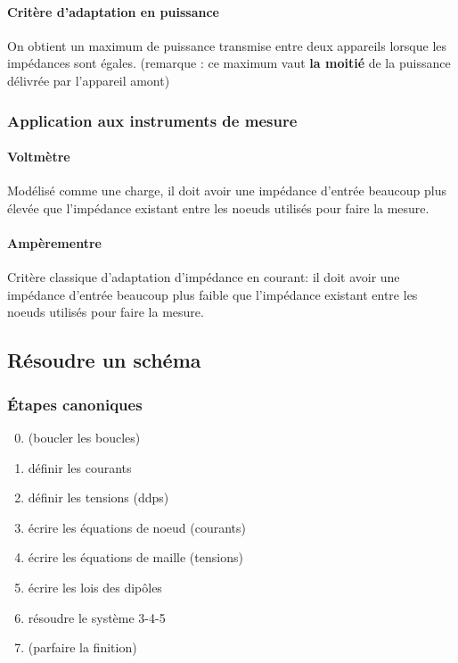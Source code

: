 \documentclass[a4paper]{article}
\begin{document}
    \paragraph{Critère d'adaptation en puissance} On obtient un maximum de puissance
    transmise entre deux appareils lorsque les impédances sont égales. (remarque :
    ce maximum vaut \textbf{la moitié} de la puissance délivrée par l'appareil amont)

    \subsubsection{Application aux instruments de mesure}
    \paragraph{Voltmètre} Modélisé comme une charge, il doit avoir une
    impédance d'entrée beaucoup plus élevée que l'impédance existant entre les 
    noeuds utilisés pour faire la mesure.

    \paragraph{Ampèrementre} Critère classique d'adaptation d'impédance en courant:
    il doit avoir une impédance d'entrée beaucoup plus faible que l'impédance
    existant entre les noeuds utilisés pour faire la mesure.


    \subsection{Résoudre un schéma}
    \subsubsection{\'Etapes canoniques}
    \begin{enumerate}
        \setcounter{enumi}{-1}
        \item (boucler les boucles)
        \item définir les courants
        \item définir les tensions (ddps)
        \item écrire les équations de noeud (courants)
        \item écrire les équations de maille (tensions)
        \item écrire les lois des dipôles
        \item résoudre le système 3-4-5
        \item (parfaire la finition)
    \end{enumerate}
\end{document}
